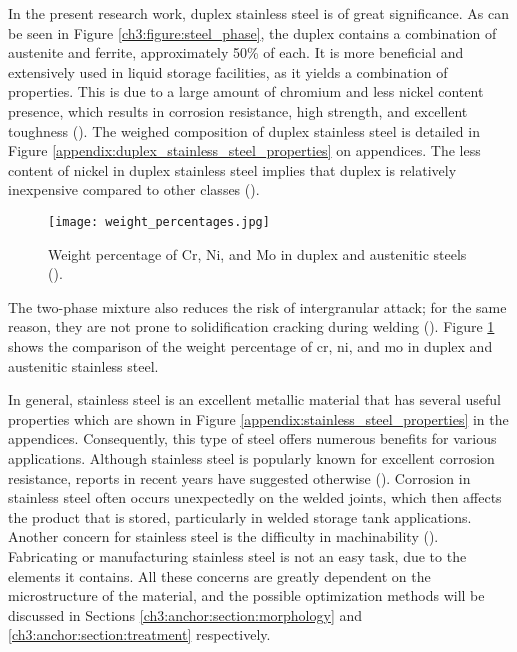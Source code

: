In the present research work, duplex stainless steel is of great significance. As can be seen in Figure \ref{ch3:figure:steel_phase}, the duplex contains a combination of austenite and ferrite, approximately 50\% of each. It is more beneficial and extensively used in liquid storage facilities, as it yields a combination of properties. This is due to a large amount of chromium and less nickel content presence, which results in corrosion resistance, high strength, and excellent toughness (\cite{gunn1997duplex}). The weighed composition of duplex stainless steel is detailed in Figure \ref{appendix:duplex_stainless_steel_properties} on appendices. The less content of nickel in duplex stainless steel implies that duplex is relatively inexpensive compared to other classes (\cite{sourmail2005stainless}). 

\begin{figure}[H]
    \centering
    \texttt{[image: weight\_percentages.jpg]}
    \caption{Weight percentage of Cr, Ni, and Mo in duplex and austenitic steels (\cite{sourmail2005stainless}).}
    \label{ch3:figure:weight}
\end{figure}
The two-phase mixture also reduces the risk of intergranular attack; for the same reason, they are not prone to solidification cracking during welding (\cite{sourmail2005stainless}). Figure \ref{ch3:figure:weight} shows the comparison of the weight percentage of \acrfull{cr}, \acrfull{ni}, and \acrfull{mo} in duplex and austenitic stainless steel.
 
In general, stainless steel is an excellent metallic material that has several useful properties which are shown in Figure \ref{appendix:stainless_steel_properties} in the appendices. Consequently, this type of steel offers numerous benefits for various applications. Although stainless steel is popularly known for excellent corrosion resistance, reports in recent years have suggested otherwise (\cite{karayan2014weld}). Corrosion in stainless steel often occurs unexpectedly on the welded joints, which then affects the product that is stored, particularly in welded storage tank applications. Another concern for stainless steel is the difficulty in machinability (\cite{grzesik2008advanced}). Fabricating or manufacturing stainless steel is not an easy task, due to the elements it contains. All these concerns are greatly dependent on the microstructure of the material, and the possible optimization methods will be discussed in Sections \ref{ch3:anchor:section:morphology} and \ref{ch3:anchor:section:treatment} respectively.

